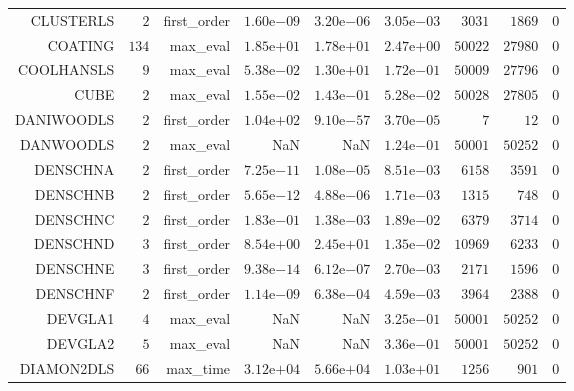 \begin{longtable}{rrrrrrrrr}
CLUSTERLS & \(     2\) & first\_order & \( 1.60\)e\(-09\) & \( 3.20\)e\(-06\) & \( 3.05\)e\(-03\) & \(  3031\) & \(  1869\) & \(     0\) \\
COATING & \(   134\) & max\_eval & \( 1.85\)e\(+01\) & \( 1.78\)e\(+01\) & \( 2.47\)e\(+00\) & \( 50022\) & \( 27980\) & \(     0\) \\
COOLHANSLS & \(     9\) & max\_eval & \( 5.38\)e\(-02\) & \( 1.30\)e\(+01\) & \( 1.72\)e\(-01\) & \( 50009\) & \( 27796\) & \(     0\) \\
CUBE & \(     2\) & max\_eval & \( 1.55\)e\(-02\) & \( 1.43\)e\(-01\) & \( 5.28\)e\(-02\) & \( 50028\) & \( 27805\) & \(     0\) \\
DANIWOODLS & \(     2\) & first\_order & \( 1.04\)e\(+02\) & \( 9.10\)e\(-57\) & \( 3.70\)e\(-05\) & \(     7\) & \(    12\) & \(     0\) \\
DANWOODLS & \(     2\) & max\_eval &       NaN &       NaN & \( 1.24\)e\(-01\) & \( 50001\) & \( 50252\) & \(     0\) \\
DENSCHNA & \(     2\) & first\_order & \( 7.25\)e\(-11\) & \( 1.08\)e\(-05\) & \( 8.51\)e\(-03\) & \(  6158\) & \(  3591\) & \(     0\) \\
DENSCHNB & \(     2\) & first\_order & \( 5.65\)e\(-12\) & \( 4.88\)e\(-06\) & \( 1.71\)e\(-03\) & \(  1315\) & \(   748\) & \(     0\) \\
DENSCHNC & \(     2\) & first\_order & \( 1.83\)e\(-01\) & \( 1.38\)e\(-03\) & \( 1.89\)e\(-02\) & \(  6379\) & \(  3714\) & \(     0\) \\
DENSCHND & \(     3\) & first\_order & \( 8.54\)e\(+00\) & \( 2.45\)e\(+01\) & \( 1.35\)e\(-02\) & \( 10969\) & \(  6233\) & \(     0\) \\
DENSCHNE & \(     3\) & first\_order & \( 9.38\)e\(-14\) & \( 6.12\)e\(-07\) & \( 2.70\)e\(-03\) & \(  2171\) & \(  1596\) & \(     0\) \\
DENSCHNF & \(     2\) & first\_order & \( 1.14\)e\(-09\) & \( 6.38\)e\(-04\) & \( 4.59\)e\(-03\) & \(  3964\) & \(  2388\) & \(     0\) \\
DEVGLA1 & \(     4\) & max\_eval &       NaN &       NaN & \( 3.25\)e\(-01\) & \( 50001\) & \( 50252\) & \(     0\) \\
DEVGLA2 & \(     5\) & max\_eval &       NaN &       NaN & \( 3.36\)e\(-01\) & \( 50001\) & \( 50252\) & \(     0\) \\
DIAMON2DLS & \(    66\) & max\_time & \( 3.12\)e\(+04\) & \( 5.66\)e\(+04\) & \( 1.03\)e\(+01\) & \(  1256\) & \(   901\) & \(     0\) \\

\end{longtable}
